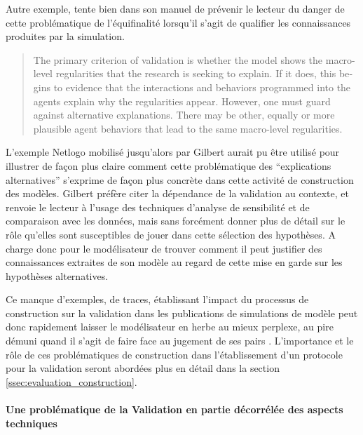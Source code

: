 Autre exemple, \textcite{Gilbert2008} tente bien dans son manuel de prévenir le lecteur du danger de cette problématique de l'équifinalité lorsqu'il s'agit de qualifier les connaissances produites par la simulation.

\foreignblockquote{english}[{\cite[31-32]{Gilbert2008}}]{The primary criterion of validation is whether the model shows the macro-level regularities that the research is seeking to explain. If it does, this begins to evidence that the interactions and behaviors programmed into the agents explain why the regularities appear. However, one must guard against alternative explanations. There may be other, equally or more plausible agent behaviors that lead to the same macro-level regularities.}

L'exemple Netlogo mobilisé jusqu'alors par Gilbert aurait pu être utilisé pour illustrer de façon plus claire comment cette problématique des \enquote{explications alternatives} s'exprime de façon plus concrète dans cette activité de construction des modèles. Gilbert préfère citer la dépendance de la validation au contexte, et renvoie le lecteur à l'usage des techniques d'analyse de sensibilité et de comparaison avec les données, mais sans forcément donner plus de détail sur le rôle qu'elles sont susceptibles de jouer dans cette sélection des hypothèses. A charge donc pour le modélisateur de trouver comment il peut justifier des connaissances extraites de son modèle au regard de cette mise en garde sur les hypothèses alternatives.

Ce manque d'exemples, de traces, établissant l'impact du processus de construction sur la validation dans les publications de simulations de modèle peut donc rapidement laisser le modélisateur en herbe au mieux perplexe, au pire démuni quand il s'agit de faire face au jugement de ses pairs \autocite{Manzo2007a}. L'importance et le rôle de ces problématiques de construction dans l'établissement d'un protocole pour la validation seront abordées plus en détail dans la section \ref{ssec:evaluation_construction}.

\paragraph{Une problématique de la Validation en partie décorrélée des aspects techniques}
\label{decorreler_validation}

